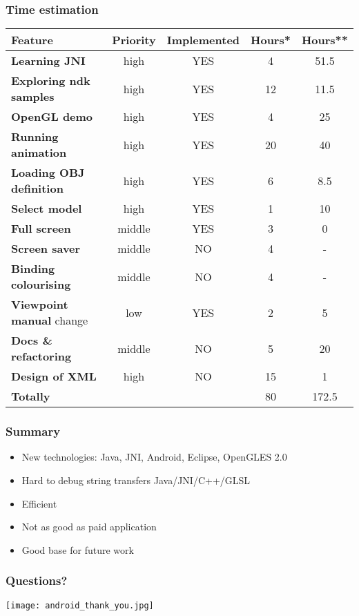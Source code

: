 \begin{frame}\frametitle{Time estimation} 
\begin{tabular}{| l || c | c |  c | c |}
\hline
Feature & Priority & Implemented & Hours* & Hours**\\
\hline
\hline
\textbf{Learning JNI} & high & YES &                 4 & 51.5\\
\textbf{Exploring ndk samples} & high & YES &       12 & 11.5\\
\textbf{OpenGL demo} & high & YES &                  4 & 25\\
\textbf{Running animation} & high & YES &           20 & 40\\
\textbf{Loading OBJ definition} & high & YES &       6 &  8.5\\
\textbf{Select model} & high & YES &                 1 & 10\\
\textbf{Full screen} & middle & YES &                3 &  0\\
\textbf{Screen saver} & middle & NO &                4 &  -\\
\textbf{Binding colourising} & middle & NO &         4 & -\\
\textbf{Viewpoint manual} change & low & YES &       2 & 5\\
\textbf{Docs \& refactoring} & middle & NO &         5 & 20\\
\textbf{Design of XML} & high & NO &                15 & 1\\
\hline
\textbf{Totally} & & &                                80 & 172.5 \\
\hline
\end{tabular}
\end{frame}

\begin{frame}\frametitle{Summary} 
\begin{itemize}
    \item New technologies: Java, JNI, Android, Eclipse, OpenGLES 2.0
    \item Hard to debug string transfers Java/JNI/C++/GLSL
    \item Efficient
    \item Not as good as paid application
    \item Good base for future work
\end{itemize}
\end{frame}


\begin{frame}\frametitle{Questions?} 
\begin{center}
\texttt{[image: android\_thank\_you.jpg]}
\end{center}
\end{frame}
